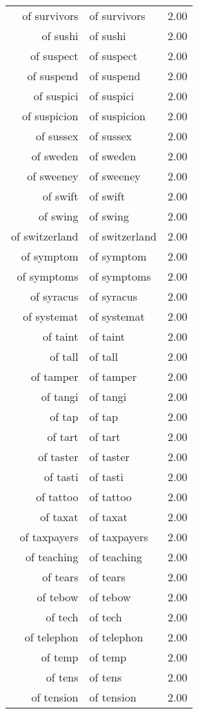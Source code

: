 \begin{table}[ht]
\begin{tabular}{rlr}
  of survivors & of survivors & 2.00 \\ 
  of sushi & of sushi & 2.00 \\ 
  of suspect & of suspect & 2.00 \\ 
  of suspend & of suspend & 2.00 \\ 
  of suspici & of suspici & 2.00 \\ 
  of suspicion & of suspicion & 2.00 \\ 
  of sussex & of sussex & 2.00 \\ 
  of sweden & of sweden & 2.00 \\ 
  of sweeney & of sweeney & 2.00 \\ 
  of swift & of swift & 2.00 \\ 
  of swing & of swing & 2.00 \\ 
  of switzerland & of switzerland & 2.00 \\ 
  of symptom & of symptom & 2.00 \\ 
  of symptoms & of symptoms & 2.00 \\ 
  of syracus & of syracus & 2.00 \\ 
  of systemat & of systemat & 2.00 \\ 
  of taint & of taint & 2.00 \\ 
  of tall & of tall & 2.00 \\ 
  of tamper & of tamper & 2.00 \\ 
  of tangi & of tangi & 2.00 \\ 
  of tap & of tap & 2.00 \\ 
  of tart & of tart & 2.00 \\ 
  of taster & of taster & 2.00 \\ 
  of tasti & of tasti & 2.00 \\ 
  of tattoo & of tattoo & 2.00 \\ 
  of taxat & of taxat & 2.00 \\ 
  of taxpayers & of taxpayers & 2.00 \\ 
  of teaching & of teaching & 2.00 \\ 
  of tears & of tears & 2.00 \\ 
  of tebow & of tebow & 2.00 \\ 
  of tech & of tech & 2.00 \\ 
  of telephon & of telephon & 2.00 \\ 
  of temp & of temp & 2.00 \\ 
  of tens & of tens & 2.00 \\ 
  of tension & of tension & 2.00 \\ 

\end{tabular}
\end{table}
